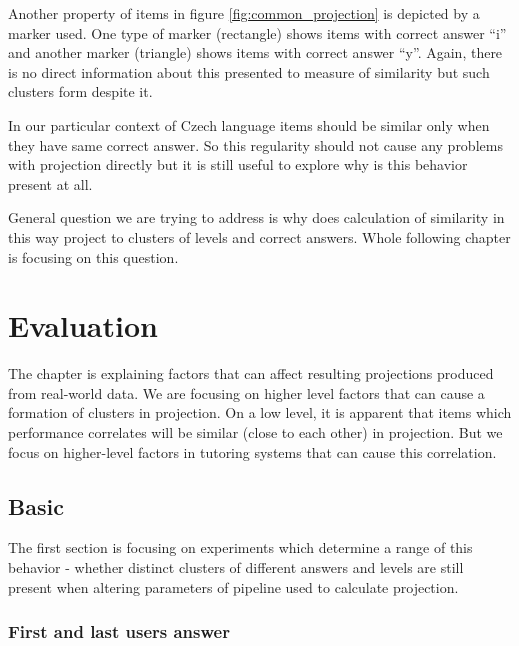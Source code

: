 \documentclass[
  digital, %
  table,   %
  nolof,     %
  nolot,     %
  nocover
]{fithesis3}
\begin{document}
Another property of items in figure \ref{fig:common_projection} is depicted by a marker used. One type of marker (rectangle) shows items with correct answer ``i'' and another marker (triangle) shows items with correct answer ``y''. Again, there is no direct information about this presented to measure of similarity but such clusters form despite it.

In our particular context of Czech language items should be similar only when they have same correct answer. So this regularity should not cause any problems with projection directly but it is still useful to explore why is this behavior present at all.


General question we are trying to address is why does calculation of similarity in this way project to clusters of levels and correct answers. Whole following chapter is focusing on this question.


\chapter{Evaluation}\label{evaulation}

The chapter is explaining factors that can affect resulting projections produced from real-world data. We are focusing on higher level factors that can cause a formation of clusters in projection. On a low level, it is apparent that items which performance correlates will be similar (close to each other) in projection. But we focus on higher-level factors in tutoring systems that can cause this correlation.

\section{Basic}\label{evaulation-basic}

The first section is focusing on experiments which determine a range of this behavior - whether distinct clusters of different answers and levels are still present when altering parameters of pipeline used to calculate projection.

\subsection{First and last users answer}\label{first-and-last-users-answer}
\end{document}
